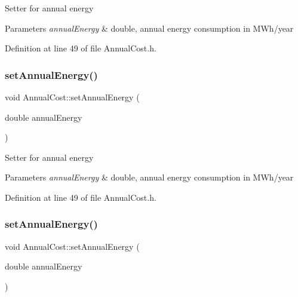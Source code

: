 Setter for annual energy 
\begin{DoxyParams}{Parameters}
{\em annual\+Energy} & double, annual energy consumption in M\+Wh/year \\
\hline
\end{DoxyParams}


Definition at line 49 of file Annual\+Cost.\+h.

\mbox{\label{class_annual_cost_a4379cc7b591abefb2302d74c57227357}} 
\subsubsection{\texorpdfstring{set\+Annual\+Energy()}{setAnnualEnergy()}\hspace{0.1cm}{\footnotesize\ttfamily [2/3]}}
{\footnotesize\ttfamily void Annual\+Cost\+::set\+Annual\+Energy (\begin{DoxyParamCaption}\item[{double}]{annual\+Energy }\end{DoxyParamCaption})\hspace{0.3cm}{\ttfamily [inline]}}

Setter for annual energy 
\begin{DoxyParams}{Parameters}
{\em annual\+Energy} & double, annual energy consumption in M\+Wh/year \\
\hline
\end{DoxyParams}


Definition at line 49 of file Annual\+Cost.\+h.

\mbox{\label{class_annual_cost_a4379cc7b591abefb2302d74c57227357}} 
\subsubsection{\texorpdfstring{set\+Annual\+Energy()}{setAnnualEnergy()}\hspace{0.1cm}{\footnotesize\ttfamily [3/3]}}
{\footnotesize\ttfamily void Annual\+Cost\+::set\+Annual\+Energy (\begin{DoxyParamCaption}\item[{double}]{annual\+Energy }\end{DoxyParamCaption})\hspace{0.3cm}{\ttfamily [inline]}}

